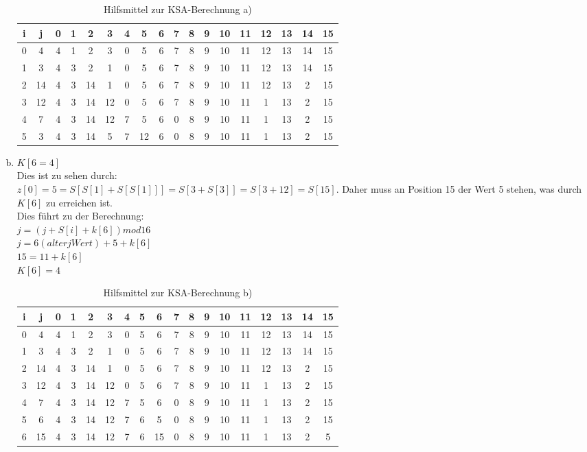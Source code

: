 \documentclass[12pt.twoside,a4paper,notitlepage]{article}
\begin{document}
\begin{enumerate}[a)]
\begin{table}[h]
\begin{tabular}{|c|c||c|c|c|c|c|c|c|c|c|c|c|c|c|c|c|c|}
\hline
i & j & 0 & 1 & 2 & 3 & 4 & 5 & 6 & 7 & 8 & 9 & 10 & 11 & 12 & 13 & 14 & 15 \\
\hline
0 & 4 & 4 & 1 & 2 & 3 & 0 & 5 & 6 & 7 & 8 & 9 & 10 & 11 & 12 & 13 & 14 & 15 \\
\hline
1 & 3 & 4 & 3 & 2 & 1 & 0 & 5 & 6 & 7 & 8 & 9 & 10 & 11 & 12 & 13 & 14 & 15 \\
\hline
2 & 14 & 4 & 3 & 14 & 1 & 0 & 5 & 6 & 7 & 8 & 9 & 10 & 11 & 12 & 13 & 2 & 15 \\
\hline
3 & 12 & 4 & 3 & 14 & 12 & 0 & 5 & 6 & 7 & 8 & 9 & 10 & 11 & 1 & 13 & 2 & 15 \\
\hline
4 & 7 & 4 & 3 & 14 & 12 & 7 & 5 & 6 & 0 & 8 & 9 & 10 & 11 & 1 & 13 & 2 & 15 \\
\hline
5 & 3 & 4 & 3 & 14 & 5 & 7 & 12 & 6 & 0 & 8 & 9 & 10 & 11 & 1 & 13 & 2 & 15 \\
\hline
\end{tabular}
\caption{Hilfsmittel zur KSA-Berechnung a)}
\label{tab:ksa}
\end{table}

\item $K[6=4]$\\
Dies ist zu sehen durch: \\
$z[0]=5=S[S[1]+S[S[1]]]=S[3+S[3]]=S[3+12]=S[15]$. Daher muss an Position 15 der Wert 5 stehen, was durch $K[6]$ zu 
erreichen ist.\\
Dies führt zu der Berechnung: \\
$j = (j + S[i] + k[6]) mod 16 $\\
$j = 6(alter j Wert) + 5 + k[6]$ \\
$15 = 11 + k[6]$\\
$K[6] = 4 $
\begin{table}[h]
\centering
\begin{tabular}{|c|c||c|c|c|c|c|c|c|c|c|c|c|c|c|c|c|c|}
\hline
i & j & 0 & 1 & 2 & 3 & 4 & 5 & 6 & 7 & 8 & 9 & 10 & 11 & 12 & 13 & 14 & 15 \\
\hline
0 & 4 & 4 & 1 & 2 & 3 & 0 & 5 & 6 & 7 & 8 & 9 & 10 & 11 & 12 & 13 & 14 & 15 \\
\hline
1 & 3 & 4 & 3 & 2 & 1 & 0 & 5 & 6 & 7 & 8 & 9 & 10 & 11 & 12 & 13 & 14 & 15 \\
\hline
2 & 14 & 4 & 3 & 14 & 1 & 0 & 5 & 6 & 7 & 8 & 9 & 10 & 11 & 12 & 13 & 2 & 15 \\
\hline
3 & 12 & 4 & 3 & 14 & 12 & 0 & 5 & 6 & 7 & 8 & 9 & 10 & 11 & 1 & 13 & 2 & 15 \\
\hline
4 & 7 & 4 & 3 & 14 & 12 & 7 & 5 & 6 & 0 & 8 & 9 & 10 & 11 & 1 & 13 & 2 & 15 \\
\hline
5 & 6 & 4 & 3 & 14 & 12 & 7 & 6 & 5 & 0 & 8 & 9 & 10 & 11 & 1 & 13 & 2 & 15 \\
\hline
6 & 15 & 4 & 3 & 14 & 12 & 7 & 6 & 15 & 0 & 8 & 9 & 10 & 11 & 1 & 13 & 2 & 5 \\
\hline
\end{tabular}
\caption{Hilfsmittel zur KSA-Berechnung b)}
\label{tab:ksa}
\end{table}


\end{enumerate}
\end{document}
